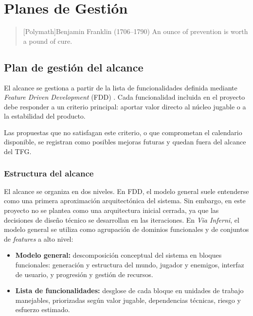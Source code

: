 \chapter{Planes de Gestión}

\begin{quotation}[Polymath]{Benjamin Franklin (1706--1790)}
An ounce of prevention is worth a pound of cure.
\end{quotation}

\begin{abstract}
En este capítulo se desarrollan los principales planes de gestión aplicados al proyecto. Su
contenido adopta PMBOK como marco de referencia y selecciona los planes útiles para un
Trabajo de Fin de Grado de desarrollo de videojuegos, manteniendo un nivel de formalidad
suficiente para controlar alcance, cronograma, comunicaciones, riesgos, calidad y costes sin
introducir una carga documental desproporcionada \cite{pmbok2021}.
\end{abstract}

\section{Plan de gestión del alcance}
El alcance se gestiona a partir de la lista de funcionalidades definida mediante
\textit{Feature Driven Development} (FDD) \cite{palmer2002fdd}. Cada funcionalidad incluida
en el proyecto debe responder a un criterio principal: aportar valor directo al núcleo
jugable o a la estabilidad del producto.

Las propuestas que no satisfagan este criterio, o que comprometan el calendario disponible,
se registran como posibles mejoras futuras y quedan fuera del alcance del TFG.

\subsection{Estructura del alcance}
El alcance se organiza en dos niveles. En FDD, el modelo general suele entenderse como una
primera aproximación arquitectónica del sistema. Sin embargo, en este proyecto no se plantea
como una arquitectura inicial cerrada, ya que las decisiones de diseño técnico se desarrollan
en las iteraciones. En \textit{Via Inferni}, el modelo general se utiliza como agrupación de
dominios funcionales y de conjuntos de \textit{features} a alto nivel:

\begin{itemize}
    \item \textbf{Modelo general:} descomposición conceptual del sistema en bloques
    funcionales: generación y estructura del mundo, jugador y enemigos, interfaz de usuario,
    y progresión y gestión de recursos.
    \item \textbf{Lista de funcionalidades:} desglose de cada bloque en unidades de trabajo
    manejables, priorizadas según valor jugable, dependencias técnicas, riesgo y esfuerzo
    estimado.
\end{itemize}

